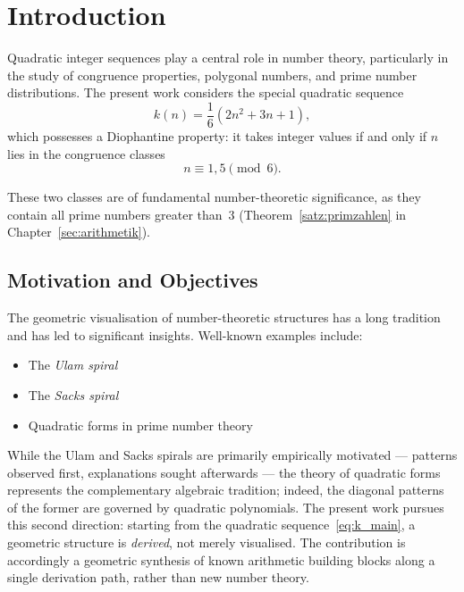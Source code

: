 \chapter{Introduction}

Quadratic integer sequences play a central role in number theory,
particularly in the study of congruence properties, polygonal numbers,
and prime number distributions. The present work considers the special
quadratic sequence
\begin{equation}\label{eq:k_main}
k(n) = \frac{1}{6}(2n^2 + 3n + 1),
\end{equation}
which possesses a Diophantine property: it takes integer
values if and only if $n$ lies in the congruence classes
\begin{equation}\label{eq:congruence}
n \equiv 1, 5 \pmod{6}.
\end{equation}

These two classes are of fundamental number-theoretic significance, as they
contain all prime numbers greater than~$3$ (Theorem~\ref{satz:primzahlen} in
Chapter~\ref{sec:arithmetik}).

\section*{Motivation and Objectives}

The geometric visualisation of number-theoretic structures has a long
tradition and has led to significant insights. Well-known examples include:
\begin{itemize}[leftmargin=2em]
\item The \emph{Ulam spiral}~\cite{Stein1964}
\item The \emph{Sacks spiral}~\cite{Sacks2003}
\item Quadratic forms in prime number theory
\end{itemize}

While the Ulam and Sacks spirals are primarily empirically motivated ---
patterns observed first, explanations sought afterwards --- the theory of
quadratic forms represents the complementary algebraic tradition; indeed,
the diagonal patterns of the former are governed by quadratic polynomials.
The present work pursues this second direction:
starting from the quadratic sequence~\eqref{eq:k_main}, a geometric
structure is \emph{derived}, not merely visualised. The contribution is accordingly a geometric synthesis of known arithmetic building blocks along a single derivation path, rather than new number theory.

